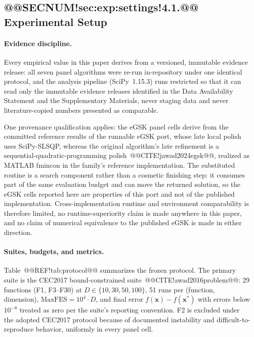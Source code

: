 \documentclass[10pt,a4paper]{article}
\newcommand{\egsk}{eGSK}
\begin{document}
\subsection{@@SECNUM!sec:exp:settings!4.1.@@ Experimental Setup}\label{sec:exp:settings}


\paragraph{Evidence discipline.}
Every empirical value in this paper derives from a versioned, immutable
evidence release: all seven
panel algorithms were re-run in-repository under one identical
protocol, and the analysis pipeline
(SciPy~1.15.3) runs
restricted so that it can read only the immutable evidence releases
identified in the Data Availability Statement and the Supplementary
Materials, never staging data and never
literature-copied numbers
presented as comparable.

One provenance qualification applies: the \egsk{} panel cells derive
from the committed reference results of the runnable \egsk{} port,
whose late local polish uses SciPy-SLSQP, whereas the original
algorithm's late refinement is a sequential-quadratic-programming
polish~@@CITE!jawad2024egsk@@, realized as MATLAB fmincon in the family's
reference implementation. The substituted routine is a search
component rather than a cosmetic finishing step: it consumes part of the
same evaluation budget and can move the returned solution, so the \egsk{}
cells reported here are properties of this port and not of the published
implementation. Cross-implementation runtime and environment comparability
is therefore limited, no runtime-superiority claim is made anywhere in this
paper, and no claim of numerical equivalence to the published \egsk{} is
made in either direction.


\paragraph{Suites, budgets, and metrics.}
Table~@@REF!tab:protocol@@ summarizes the frozen protocol. The primary
suite is the CEC2017 bound-constrained suite~@@CITE!awad2016problem@@:
29 functions (F1, F3--F30) at $D \in \{10, 30, 50, 100\}$, 51 runs per
(function, dimension), $\mathrm{MaxFES} = 10^{4} \cdot D$, and final
error $f(\mathbf{x}) - f(\mathbf{x}^{*})$ with errors below $10^{-8}$
treated as zero per the suite's reporting convention. F2 is excluded under the
adopted CEC2017 protocol because of documented instability and
difficult-to-reproduce behavior, uniformly in every panel cell.
\end{document}

